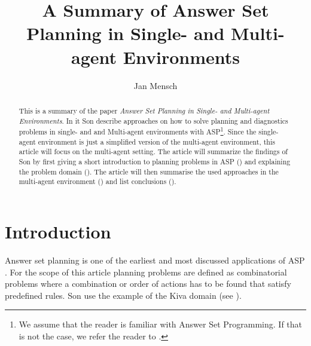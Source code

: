 \documentclass[runningheads]{llncs}
\newcommand{\papertitle}{Answer Set Planning in Single- and Multi-agent Environments}
\newcommand{\authorquote}{Son \etal}
\begin{document}
\title{A Summary of \papertitle}

\author{Jan Mensch}




%
\maketitle              %


\begin{abstract}
This is a summary of the paper \textit{\papertitle}. In it \authorquote{} describe approaches on how to solve planning and diagnostics problems in single- and and Multi-agent environments with ASP\footnote{We assume that the reader is familiar with Answer Set Programming. If that is not the case, we refer the reader to \cite{erdem2016applications}.}. Since the single-agent environment is just a simplified version of the multi-agent environment, this article will focus on the multi-agent setting. The article will summarize the findings of \authorquote{} by first giving a  short introduction to planning problems in ASP () and explaining the problem domain (). The article will then summarise the used approaches in the multi-agent environment () and list conclusions ().

\end{abstract}




\section{Introduction} \label{8:sec:introduction}

Answer set planning is one of the earliest and most discussed applications of ASP \cite{marek1999stable, niemela1999logic}. For the scope of this article planning problems are defined as combinatorial problems where a combination or order of actions has to be found that satisfy predefined rules. \authorquote{} use the example of the Kiva domain (see ). 
\end{document}
